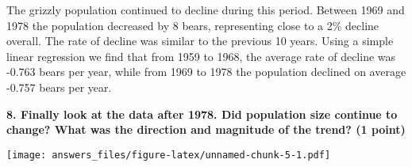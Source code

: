 \documentclass[]{article}
\newenvironment{Shaded}{\begin{snugshade}}{\end{snugshade}}
\newcommand{\KeywordTok}[1]{\textcolor[rgb]{0.13,0.29,0.53}{\textbf{#1}}}
\newcommand{\DataTypeTok}[1]{\textcolor[rgb]{0.13,0.29,0.53}{#1}}
\newcommand{\DecValTok}[1]{\textcolor[rgb]{0.00,0.00,0.81}{#1}}
\newcommand{\StringTok}[1]{\textcolor[rgb]{0.31,0.60,0.02}{#1}}
\newcommand{\OperatorTok}[1]{\textcolor[rgb]{0.81,0.36,0.00}{\textbf{#1}}}
\newcommand{\NormalTok}[1]{#1}
\begin{document}
The grizzly population continued to decline during this period. Between
1969 and 1978 the population decreased by 8 bears, representing close to
a 2\% decline overall. The rate of decline was similar to the previous
10 years. Using a simple linear regression we find that from 1959 to
1968, the average rate of decline was -0.763 bears per year, while from
1969 to 1978 the population declined on average -0.757 bears per year.

\textbf{8. Finally look at the data after 1978. Did population size
continue to change? What was the direction and magnitude of the trend?
(1 point)}

\begin{Shaded}
\end{Shaded}

\texttt{[image: answers\_files/figure-latex/unnamed-chunk-5-1.pdf]}
\end{document}
